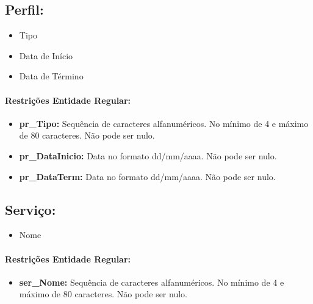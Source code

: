 \documentclass{report}
\begin{document}
\subsection{Perfil:}
\begin{itemize}
  \item Tipo
  \item Data de Início
  \item Data de Término
\end{itemize}
\paragraph{Restrições Entidade Regular:}
\begin{itemize}
  \item \textbf{pr\_Tipo:} Sequência de caracteres alfanuméricos. No mínimo de 4 e máximo de 80 caracteres. Não pode ser nulo.
  \item \textbf{pr\_DataInicio:} Data no formato dd/mm/aaaa. Não pode ser nulo.
  \item \textbf{pr\_DataTerm:} Data no formato dd/mm/aaaa. Não pode ser nulo.
\end{itemize}

\subsection{Serviço:}
\begin{itemize}
  \item Nome
\end{itemize}
\paragraph{Restrições Entidade Regular:}
\begin{itemize}
  \item \textbf{ser\_Nome:} Sequência de caracteres alfanuméricos. No mínimo de 4 e máximo de 80 caracteres. Não pode ser nulo.
\end{itemize}
\end{document}
